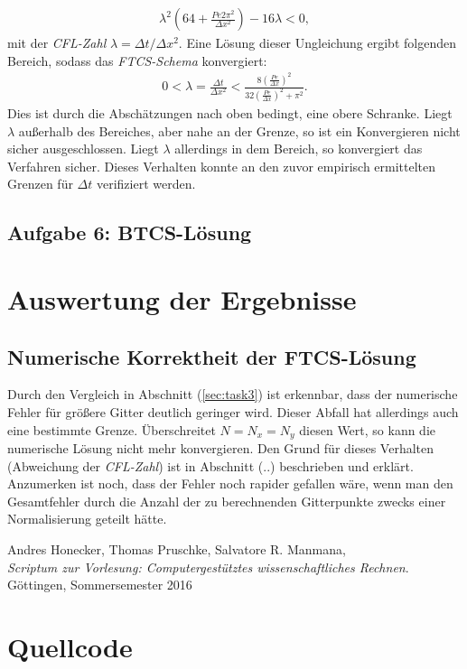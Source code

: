 \documentclass[12pt,a4paper,titlepage,headinclude,bibtotoc]{scrartcl}
\begin{document}
\begin{align}
\lambda^2 \left(64 + \frac{Pe 2 \pi^2}{\Delta x^2} \right) -16 \lambda <0,
\end{align}
mit der \textit{CFL-Zahl} $\lambda = \Delta t/\Delta x^2$.
Eine Lösung dieser Ungleichung ergibt folgenden Bereich, sodass das \textit{FTCS-Schema} konvergiert:
\begin{align}
0 < \lambda = \frac{\Delta t}{\Delta x^2} < \frac{8 \left(\frac{Pe}{\Delta x}\right)^2}{32\left(\frac{Pe}{\Delta x}\right)^2 + \pi^2}.
\end{align}
Dies ist durch die Abschätzungen nach oben bedingt, eine obere Schranke. Liegt $\lambda$ außerhalb des Bereiches, aber nahe an der Grenze, so ist ein Konvergieren nicht sicher ausgeschlossen. Liegt $\lambda$ allerdings in dem Bereich, so konvergiert das Verfahren sicher. Dieses Verhalten konnte an den zuvor empirisch ermittelten Grenzen für $\Delta t$ verifiziert werden.
\subsection{Aufgabe 6: BTCS-Lösung}
\label{sec:task6}

\section{Auswertung der Ergebnisse}
\label{sec:interpretation}
\subsection{Numerische Korrektheit der FTCS-Lösung}
\label{sec:disc_num_corr}
Durch den Vergleich in Abschnitt (\ref{sec:task3}) ist erkennbar, dass der numerische Fehler für größere Gitter deutlich geringer wird. Dieser Abfall hat allerdings auch eine bestimmte Grenze. Überschreitet $N = N_x = N_y$ diesen Wert, so kann die numerische Lösung nicht mehr konvergieren. Den Grund für dieses Verhalten (Abweichung der \textit{CFL-Zahl}) ist in Abschnitt (..) beschrieben und erklärt. Anzumerken ist noch, dass der Fehler noch rapider gefallen wäre, wenn man den Gesamtfehler durch die Anzahl der zu berechnenden Gitterpunkte zwecks einer Normalisierung geteilt hätte.

\begin{thebibliography}{9}
  Andres Honecker, Thomas Pruschke, Salvatore R. Manmana, \\
  \emph{Scriptum zur Vorlesung: Computergestütztes wissenschaftliches Rechnen}. \\
 Göttingen,
  Sommersemester 2016
 
 
 
 \end{thebibliography}

\appendix
\section{Quellcode}
\label{sec:source} 
%
\end{document}
